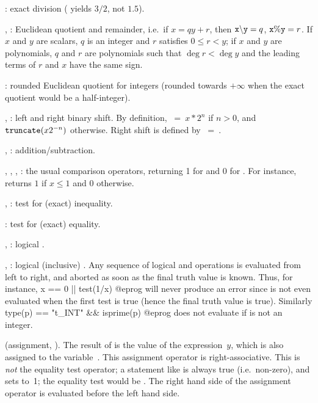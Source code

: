 \kbd{/}: exact division ( yields $3/2$, not $1.5$).

\kbd{\bs}, \kbd{\%}: Euclidean quotient and remainder, i.e.~if $x =
qy + r$, then $\kbd{x \b{ } y} = q$, ${\tt x\%y} = r$. If $x$ and $y$
are scalars, $q$ is an integer and $r$ satisfies $0\le r < y$; if $x$ and $y$
are polynomials, $q$ and $r$ are polynomials such that $\deg r< \deg y$ and
the leading terms of $r$ and $x$ have the same sign.

\kbd{\bs/}: rounded Euclidean quotient for integers (rounded towards
$+\infty$ when the exact quotient would be a half-integer).

\kbd{<<}, \kbd{>>}: left and right binary shift. By definition,
$~=~x * 2^n$ if $n>0$, and ${\tt truncate}(x 2^{-n})$ otherwise.
Right shift is defined by $~=~$.

%
\kbd{+}, \kbd{-}: addition/subtraction.

%
\kbd{<}, \kbd{>}, \kbd{<=}, \kbd{>=}: the usual comparison operators,
returning 1 for  and 0 for . For instance,
 returns $1$ if $x\le 1$ and $0$ otherwise.

\kbd{<>}, \kbd{!=}: test for (exact) inequality.

\kbd{==}: test for (exact) equality.

%
\kbd{\&}, \kbd{\&\&}: logical .

\kbd{|}, \kbd{||}: logical (inclusive) . Any sequence of logical
 and  operations is evaluated from left to right,
and aborted as soon as the final truth value is known. Thus, for instance,
\bprog
  x == 0 || test(1/x)
@eprog\noindent
will never produce an error since  is not even evaluated
when the first test is true (hence the final truth value is true). Similarly
\bprog
  type(p) == "t_INT" && isprime(p)
@eprog\noindent
does not evaluate  if  is not an integer.

%
\kbd{=} (assignment,  \kbd{=} ). The result of
 is the value of the expression~$y$, which is also assigned to
the variable~. This assignment operator is right-associative. This is
\emph{not} the equality test operator; a statement like  is always
true (i.e.~non-zero), and sets  to~1; the equality test would be
. The right hand side of the assignment operator is evaluated
before the left hand side.

